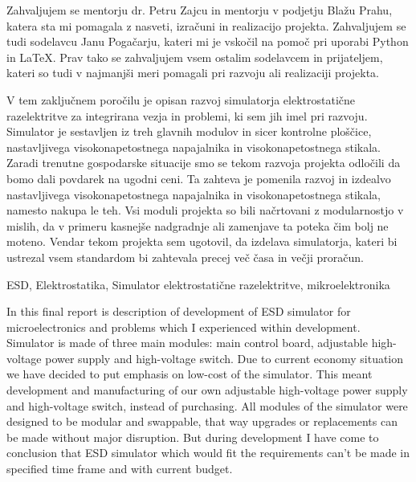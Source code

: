\documentclass[a4paper,twoside,openright,12pt,slovene]{book}
\date{Ljubljana, \the\year}
\begin{document}
\frontmatter


\maketitle

\zahvala
Zahvaljujem se mentorju dr. Petru Zajcu in mentorju v podjetju Blažu Prahu, katera sta mi pomagala z nasveti, izračuni in realizacijo projekta. Zahvaljujem se tudi sodelavcu Janu Pogačarju, kateri mi je vskočil na pomoč pri uporabi Python in LaTeX. Prav tako se zahvaljujem vsem ostalim sodelavcem in prijateljem, kateri so tudi v najmanjši meri pomagali pri razvoju ali realizaciji projekta.


\povzetek
V tem zaključnem poročilu je opisan razvoj simulatorja elektrostatične razelektritve za integrirana vezja in problemi, ki sem jih imel pri razvoju. Simulator je sestavljen iz treh glavnih modulov in sicer kontrolne ploščice, nastavljivega visokonapetostnega napajalnika in visokonapetostnega stikala.
Zaradi trenutne gospodarske situacije smo se tekom razvoja projekta odločili da bomo dali povdarek na ugodni ceni. Ta zahteva je pomenila razvoj in izdealvo nastavljivega visokonapetostnega napajalnika in visokonapetostnega stikala, namesto nakupa le teh. 
Vsi moduli projekta so bili načrtovani z modularnostjo v mislih, da v primeru kasnejše nadgradnje ali zamenjave ta poteka čim bolj ne moteno. Vendar tekom projekta sem ugotovil, da izdelava simulatorja, kateri bi ustrezal vsem standardom bi zahtevala precej več časa in večji proračun.

\kljucnebesede
ESD, Elektrostatika, Simulator elektrostatične razelektritve, mikroelektronika



\abstract
In this final report is description of development of ESD simulator for microelectronics and problems which I experienced within development. Simulator is made of three main modules: main control board, adjustable high-voltage power supply and high-voltage switch. Due to current economy situation we have decided to put emphasis on low-cost of the simulator. This meant development and manufacturing of our own adjustable high-voltage power supply and high-voltage switch, instead of purchasing. All modules of the simulator were designed to be modular and swappable, that way upgrades or replacements can be made without major disruption. But during development I have come to conclusion that ESD simulator which would fit the requirements can't be made in specified time frame and with current budget.
\end{document}
